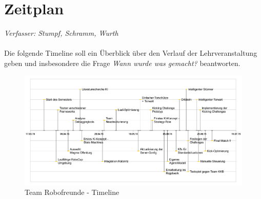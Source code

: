 \documentclass[fontsize=12pt,a4paper,final]{scrartcl}[2003/01/01]
\begin{document}
\section{Zeitplan}
\textit{Verfasser: Stumpf, Schramm, Wurth}\\
\\
Die folgende Timeline soll ein Überblick über den Verlauf der Lehrveranstaltung geben und insbesondere die Frage \textit{\glqq Wann wurde was gemacht?\grqq} beantworten.

\begin{figure}[H]
	\centering
	\includegraphics[width=\textwidth]{Grafiken/Timeline_cropped}
	\caption{Team Robofreunde - Timeline}
	\label{fig:Timeline}
\end{figure}
\end{document}
